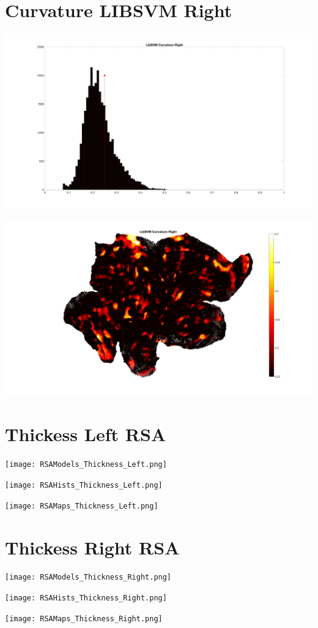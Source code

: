 \documentclass[]{article}
\begin{document}
\section{Curvature LIBSVM Right}
\centerline{\includegraphics[width=1.2\textwidth]{Curvature_LibSVM_Histograms_Right.png}}
\centerline{\includegraphics[width=1.2\textwidth]{Curvature_LibSVM_Map_Right.png}}


\newpage
\vspace*{-3cm}
\section{Thickess Left RSA}
\centerline{\texttt{[image: RSAModels\_Thickness\_Left.png]}}
\centerline{\texttt{[image: RSAHists\_Thickness\_Left.png]}}
\centerline{\texttt{[image: RSAMaps\_Thickness\_Left.png]}}

\newpage
\vspace*{-3cm}
\section{Thickess Right RSA}
\centerline{\texttt{[image: RSAModels\_Thickness\_Right.png]}}
\centerline{\texttt{[image: RSAHists\_Thickness\_Right.png]}}
\centerline{\texttt{[image: RSAMaps\_Thickness\_Right.png]}}
\end{document}
